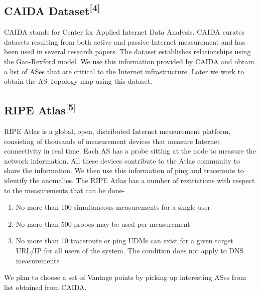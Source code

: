 \documentclass{sig-alternate-05-2015}
\begin{document}
\subsection{CAIDA Dataset\textsuperscript{[4]}}
CAIDA stands for Center for Applied Internet Data Analysis. CAIDA curates datasets resulting from both active and passive Internet measurement and has been used
in several research papers. The dataset establishes relationships using the Gao-Rexford model. We use this information provided by CAIDA and obtain a list of ASes that are critical to the Internet infrastructure. Later we work to obtain the AS Topology map using this dataset.

\subsection{RIPE Atlas\textsuperscript{[5]}}
RIPE Atlas is a global, open, distributed Internet measurement platform, consisting of thousands of measurement devices that measure Internet connectivity in real time. Each AS has a probe sitting at the node to measure the network information. All these devices contribute to the Atlas community to share the information. We then use this information of ping and traceroute to identify the anomalies.
The RIPE Atlas has a number of restrictions with respect to the measurements that can be done-
\begin{enumerate}
\item No more than 100 simultaneous measurements for a single user
\item No more than 500 probes may be used per measurement
\item No more than 10 traceroute or ping UDMs can exist for a given target URL/IP for all users of the system. The condition does not apply to DNS measurements

\end{enumerate}
We plan to choose a set of Vantage points by picking up interesting ASes from list obtained from CAIDA.
\end{document}
